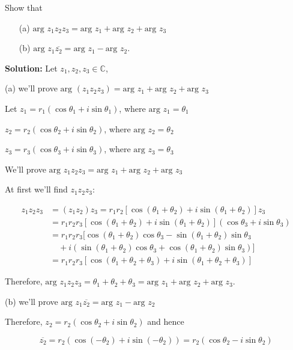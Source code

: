     \begin{exercise}
        Show that\begin{enumerate}
            \item[(a)] $\text{arg } z_1z_2z_3 = \text{arg } z_1 + \text{arg } z_2 + \text{arg } z_3$
            \item[(b)] $\text{arg } z_1 \overline{z_2} = \text{arg } z_1 - \text{arg } z_2$.
        \end{enumerate}
    \end{exercise}              
    \textbf{Solution:}
    Let $z_1, z_2, z_3 \in \mathbb{C}$,

(a) we'll prove $\text{arg }(z_1z_2z_3) = \text{arg } z_1 + \text{arg } z_2 + \text{arg } z_3$

Let $z_1 = r_1(\cos \theta_1 + i \sin \theta_1)$, where $\text{arg } z_1 = \theta_1$

$z_2 = r_2(\cos \theta_2 + i \sin \theta_2)$, where $\text{arg } z_2 = \theta_2$

$z_3 = r_3(\cos \theta_3 + i \sin \theta_3)$, where $\text{arg } z_3 = \theta_3$

We'll prove $\text{arg } z_1z_2z_3 = \text{arg } z_1 + \text{arg } z_2 + \text{arg } z_3$

At first we'll find $z_1z_2z_3$:

\begin{align*}
    z_1z_2z_3 &= (z_1z_2)z_3 = r_1r_2[\cos(\theta_1 + \theta_2) + i \sin(\theta_1 + \theta_2)]z_3 \\
    &= r_1r_2r_3[\cos(\theta_1 + \theta_2) + i \sin(\theta_1 + \theta_2)](\cos \theta_3 + i \sin \theta_3) \\
    &= r_1r_2r_3[\cos(\theta_1 + \theta_2) \cos \theta_3 - \sin(\theta_1 + \theta_2) \sin \theta_3 \\
    &\quad + i(\sin(\theta_1 + \theta_2) \cos \theta_3 + \cos(\theta_1 + \theta_2) \sin \theta_3)] \\
    &= r_1r_2r_3[\cos(\theta_1 + \theta_2 + \theta_3) + i \sin(\theta_1 + \theta_2 + \theta_3)]
\end{align*}

Therefore, $\text{arg } z_1z_2z_3 = \theta_1 + \theta_2 + \theta_3 = \text{arg } z_1 + \text{arg } z_2 + \text{arg } z_3$.

(b) we'll prove $\text{arg } z_1 \overline{z_2} = \text{arg } z_1 - \text{arg } z_2$

Therefore, $z_2 = r_2(\cos \theta_2 + i \sin \theta_2)$ and hence

\[
\overline{z_2} = r_2(\cos(-\theta_2) + i \sin(-\theta_2)) = r_2(\cos \theta_2 - i \sin \theta_2)
\]

